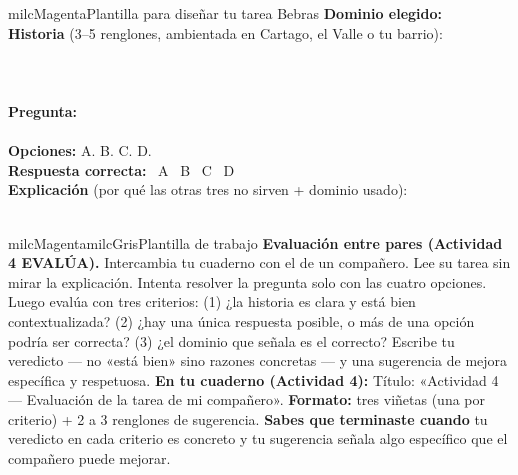 \documentclass[11pt,letterpaper]{article}
\newcommand{\checkbox}{\textcolor{milcGradeDark}{\fbox{\phantom{x}}}\hspace{5pt}}
\begin{document}
\begin{drawbox}{milcMagenta}{Plantilla para diseñar tu tarea Bebras}
\checkbox \textbf{Dominio elegido:} \underline{\hspace{6cm}} \\[3mm]
\checkbox \textbf{Historia} (3--5 renglones, ambientada en Cartago, el Valle o tu barrio): \\[6mm] \underline{\hspace{\linewidth}} \\[2mm] \underline{\hspace{\linewidth}} \\[2mm] \underline{\hspace{\linewidth}} \\[3mm]
\checkbox \textbf{Pregunta:} \\[5mm] \underline{\hspace{\linewidth}} \\[3mm]
\checkbox \textbf{Opciones:} \quad A. \underline{\hspace{3.5cm}} \quad B. \underline{\hspace{3.5cm}} \quad C. \underline{\hspace{3.5cm}} \quad D. \underline{\hspace{3.5cm}} \\[3mm]
\checkbox \textbf{Respuesta correcta:} \quad \fbox{\phantom{x}}~A \quad \fbox{\phantom{x}}~B \quad \fbox{\phantom{x}}~C \quad \fbox{\phantom{x}}~D \\[3mm]
\checkbox \textbf{Explicación} (por qué las otras tres no sirven + dominio usado): \\[6mm] \underline{\hspace{\linewidth}} \\[2mm] \underline{\hspace{\linewidth}}
\end{drawbox}

\begin{softbox}{milcMagenta}{milcGris}{Plantilla de trabajo}
\textbf{Evaluación entre pares (Actividad 4 \textbullet{} EVALÚA).} Intercambia tu cuaderno con el de un compañero. Lee su tarea sin mirar la explicación. Intenta resolver la pregunta solo con las cuatro opciones. Luego evalúa con tres criterios: (1) ¿la historia es clara y está bien contextualizada? (2) ¿hay una única respuesta posible, o más de una opción podría ser correcta? (3) ¿el dominio que señala es el correcto? Escribe tu veredicto --- no «está bien» sino razones concretas --- y una sugerencia de mejora específica y respetuosa. \textbf{En tu cuaderno (Actividad 4):} Título: «Actividad 4 --- Evaluación de la tarea de mi compañero». \textbf{Formato:} tres viñetas (una por criterio) + 2 a 3 renglones de sugerencia. \textbf{Sabes que terminaste cuando} tu veredicto en cada criterio es concreto y tu sugerencia señala algo específico que el compañero puede mejorar.
\end{softbox}
\end{document}
